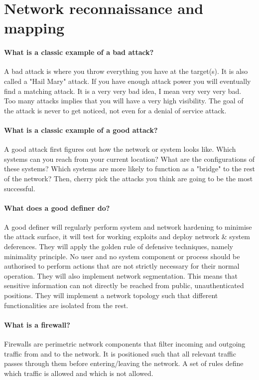 \section{Network reconnaissance and mapping}
\paragraph{What is a classic example of a bad attack?}
A bad attack is where you throw everything you have at the target(s). It is also called a "Hail Mary" attack. If you have enough attack power you will eventually find a matching attack. It is a very very bad idea, I mean very very very bad. Too many attacks implies that you will have a very high visibility. The goal of the attack is never to get noticed, not even for a denial of service attack.

\paragraph{What is a classic example of a good attack?}
A good attack first figures out how the network or system looks like. Which systems can you reach from your current location? What are the configurations of these systems? Which systems are more likely to function as a "bridge" to the rest of the network? Then, cherry pick the attacks you think are going to be the most successful.

\paragraph{What does a good definer do?}
A good definer will regularly perform system and network hardening to minimise the attack surface, it will test for working exploits and deploy network \& system deferences. They will apply the golden rule of defensive techniques, namely minimality principle. No user and no system component or process should be authorised to perform actions that are not strictly necessary for their normal operation. They will also implement network segmentation. This means that sensitive information can not directly be reached from public, unauthenticated positions. They will implement a network topology such that different functionalities are isolated from the rest.

\paragraph{What is a firewall?}
Firewalls are perimetric network components that filter incoming and outgoing traffic from and to the network. It is positioned such that all relevant traffic passes through them before entering/leaving the network. A set of rules define which traffic is allowed and which is not allowed.

